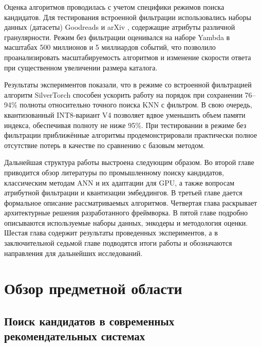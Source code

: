 \documentclass[14pt,a4paper]{extreport}
\numberwithin{figure}{chapter}
\numberwithin{table}{chapter}
\numberwithin{equation}{chapter}
\begin{document}
Оценка алгоритмов проводилась с учетом специфики режимов поиска кандидатов. Для тестирования встроенной фильтрации использовались наборы данных (датасеты) Goodreads \cite{wan2018item, wan2019fine} и arXiv \cite{clement2019arxiv}, содержащие атрибуты различной гранулярности. Режим без фильтрации оценивался на наборе Yambda \cite{yandex2025yambda} в масштабах 500 миллионов и 5 миллиардов событий, что позволило проанализировать масштабируемость алгоритмов и изменение скорости ответа при существенном увеличении размера каталога.

Результаты экспериментов показали, что в режиме со встроенной фильтрацией алгоритм SilverTorch способен ускорить работу на порядок при сохранении 76--94\% полноты относительно точного поиска KNN с фильтром. В свою очередь, квантизованный INT8-вариант V4 позволяет вдвое уменьшить объем памяти индекса, обеспечивая полноту не ниже 95\%. При тестировании в режиме без фильтрации приближённые алгоритмы продемонстрировали практически полное отсутствие потерь в качестве по сравнению с базовым методом.

Дальнейшая структура работы выстроена следующим образом. Во второй главе приводится обзор литературы по промышленному поиску кандидатов, классическим методам ANN и их адаптации для GPU, а также вопросам атрибутной фильтрации и квантизации эмбеддингов. В третьей главе дается формальное описание рассматриваемых алгоритмов. Четвертая глава раскрывает архитектурные решения разработанного фреймворка. В пятой главе подробно описываются используемые наборы данных, энкодеры и методология оценки. Шестая глава содержит результаты проведенных экспериментов, а в заключительной седьмой главе подводятся итоги работы и обозначаются направления для дальнейших исследований.

\chapter{Обзор предметной области}

\section{Поиск кандидатов в современных рекомендательных системах}
\end{document}
